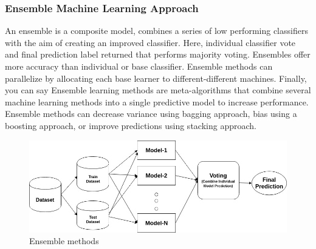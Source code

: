        \subsubsection{Ensemble Machine Learning Approach}
            An ensemble is a composite model, combines a series of low performing classifiers with the aim of creating an improved classifier. Here, individual classifier vote and final prediction label returned that performs majority voting. Ensembles offer more 
            accuracy than individual or base classifier. Ensemble methods can parallelize by allocating each base learner to different-different machines. Finally, you can say Ensemble learning methods are meta-algorithms that combine several machine learning methods 
            into a single predictive model to increase performance. Ensemble methods can decrease variance using bagging approach, bias using a boosting approach, or improve predictions using stacking approach.
            \begin{figure}[H]
                \centering
                \includegraphics[width=0.6\linewidth]{img/Ensemble.png}
                \caption{Ensemble methods}
            \end{figure}
